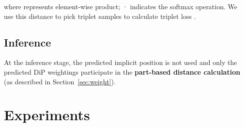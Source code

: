 \documentclass[10pt,twocolumn,letterpaper]{article}
\begin{document}
where  represents element-wise product; · indicates the softmax operation. We use this distance to pick triplet samples to calculate triplet loss .


\subsection{Inference}
\label{sec:inference}
At the inference stage, the predicted implicit position is not used and only the predicted DiP weightings participate in the \textbf{part-based distance calculation} (as described in Section~\ref{sec:weight}).


\section{Experiments}
\label{sec:experiments}
\end{document}
